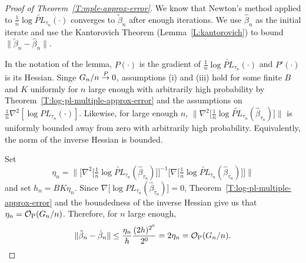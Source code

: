 \documentclass[aoas,preprint]{imsart}
\begin{document}
\begin{proof}[Proof of Theorem~\ref{T:mple-approx-error}]

We know that Newton's method applied to
$\tfrac{1}{n}\log \widetilde{\mathit{PL}}_{\tau_n}(\cdot)$ converges to
$\tilde \beta_n$ after enough iterations.  We use $\hat \beta_n$ as the
initial iterate and use the Kantorovich Theorem (Lemma~\ref{L:kantorovich})
to bound $\|\tilde \beta_n - \hat \beta_n\|$.

In the notation of the lemma, $P(\cdot)$ is the gradient of
$\tfrac{1}{n} \log \widetilde{\mathit{PL}}_{\tau_n}(\cdot)$ and $P'(\cdot)$ is its Hessian.
Singe $G_n/n \overset{\mathit{P}}{\to} 0$, assumptions (i) and (iii) hold for
some finite $B$ and $K$ uniformly for $n$ large enough with arbitrarily
high probability by
Theorem~\ref{T:log-pl-multiple-approx-error}
and the assumptions on $\tfrac{1}{n} \nabla^2 [\log {\mathit{PL}}_{\tau_n}(\cdot)]$.
Likewise, for large enough $n$,
\(
    \Big\|
        \nabla^2\big[
            \tfrac{1}{n}
            \log \widetilde{\mathit{PL}}_{\tau_n}(\hat \beta_{\tau_n})
        \big]
    \Big\|
\)
is uniformly bounded away from zero with arbitrarily high probability.
Equivalently, the norm of the inverse Hessian is bounded.

Set
\[
    \eta_n =
    \Big\|
        \Big[
            \nabla^2\big[
                \tfrac{1}{n}
                \log \widetilde{\mathit{PL}}_{\tau_n}(\hat \beta_{\tau_n})
            \big]
        \Big]^{-1}
        \Big[
            \nabla\big[
                \tfrac{1}{n}
                \log \widetilde{\mathit{PL}}_{\tau_n}(\hat \beta_{\tau_n})
            \big]
        \Big]
    \Big\|
\]
and set $h_n = B K \eta_n$.
Since $\nabla\big[\log {\mathit{PL}}_{\tau_n}(\hat \beta_{\tau_n})\big] = 0$,
Theorem~\ref{T:log-pl-multiple-approx-error} and the boundedness of the
inverse Hessian give us that $\eta_n = \mathcal{O}_\text{P}(G_n/n)$.  Therefore, for $n$
large enough,
\[
    \| \tilde \beta_n - \hat \beta_n \|
        \leq \frac{\eta_n}{h}\frac{(2h)^{2^0}}{2^0}
        = 2 \eta_n
        = \mathcal{O}_\text{P}(G_n/n).
    \qedhere
\]
\end{proof}




\end{document}

